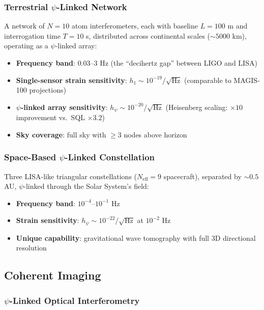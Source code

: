 \documentclass[12pt,a4paper]{article}
\theoremstyle{remark}
\begin{document}
\subsubsection{Terrestrial $\psi$-Linked Network}

A network of $N = 10$ atom interferometers, each with baseline $L = 100$ m
and interrogation time $T = 10$ s, distributed across continental scales
($\sim 5000$ km), operating as a $\psi$-linked array:

\begin{itemize}
\item \textbf{Frequency band}: $0.03$--$3$ Hz (the ``decihertz gap'' between
LIGO and LISA)
\item \textbf{Single-sensor strain sensitivity}:
$h_1 \sim 10^{-19}/\sqrt{\text{Hz}}$ (comparable to MAGIS-100 projections)
\item \textbf{$\psi$-linked array sensitivity}:
$h_\psi \sim 10^{-20}/\sqrt{\text{Hz}}$ (Heisenberg scaling: $\times 10$
improvement vs.\ SQL $\times 3.2$)
\item \textbf{Sky coverage}: full sky with $\geq 3$ nodes above horizon
\end{itemize}

\subsubsection{Space-Based $\psi$-Linked Constellation}

Three LISA-like triangular constellations ($N_{\text{eff}} = 9$ spacecraft),
separated by $\sim 0.5$ AU, $\psi$-linked through the Solar System's field:
\begin{itemize}
\item \textbf{Frequency band}: $10^{-4}$--$10^{-1}$ Hz
\item \textbf{Strain sensitivity}: $h_\psi \sim 10^{-22}/\sqrt{\text{Hz}}$
at $10^{-2}$ Hz
\item \textbf{Unique capability}: gravitational wave tomography with
full 3D directional resolution
\end{itemize}

\subsection{Coherent Imaging}\label{sec:imaging}

\subsubsection{$\psi$-Linked Optical Interferometry}
\end{document}
